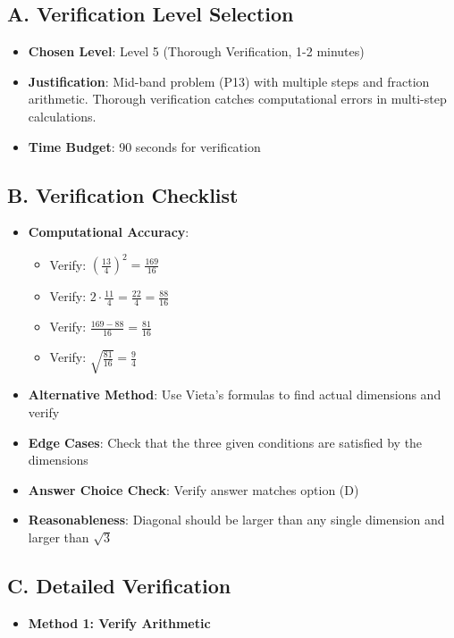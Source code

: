 \documentclass[12pt]{article}
\begin{document}
\begin{verificationbox}
\subsection*{A. Verification Level Selection}
\begin{itemize}[leftmargin=*]
    \item \textbf{Chosen Level}: Level 5 (Thorough Verification, 1-2 minutes)
    \item \textbf{Justification}: Mid-band problem (P13) with multiple steps and fraction arithmetic. Thorough verification catches computational errors in multi-step calculations.
    \item \textbf{Time Budget}: 90 seconds for verification
\end{itemize}

\subsection*{B. Verification Checklist}
\begin{itemize}[leftmargin=*]
    \item \textbf{Computational Accuracy}: 
    \begin{itemize}
        \item Verify: $\left(\frac{13}{4}\right)^2 = \frac{169}{16}$
        \item Verify: $2 \cdot \frac{11}{4} = \frac{22}{4} = \frac{88}{16}$
        \item Verify: $\frac{169-88}{16} = \frac{81}{16}$
        \item Verify: $\sqrt{\frac{81}{16}} = \frac{9}{4}$
    \end{itemize}
    \item \textbf{Alternative Method}: Use Vieta's formulas to find actual dimensions and verify
    \item \textbf{Edge Cases}: Check that the three given conditions are satisfied by the dimensions
    \item \textbf{Answer Choice Check}: Verify answer matches option (D)
    \item \textbf{Reasonableness}: Diagonal should be larger than any single dimension and larger than $\sqrt{3}$
\end{itemize}

\subsection*{C. Detailed Verification}
\begin{itemize}[leftmargin=*]
    \item \textbf{Method 1: Verify Arithmetic}
    

\end{itemize}
\end{verificationbox}
\end{document}
